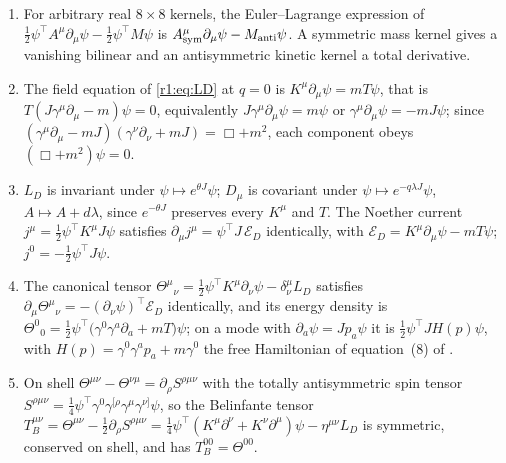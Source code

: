 \begin{proposition}
\label{r1:prop:dirac}
\begin{enumerate}[label=(\roman*),leftmargin=2.2em]
\item For arbitrary real $8\times8$ kernels, the Euler--Lagrange expression of $\tfrac12\psi^{\!\top}A^\mu\partial_\mu\psi-\tfrac12\psi^{\!\top}M\psi$
is $A^\mu_{\rm sym}\partial_\mu\psi-M_{\rm anti}\psi$. A symmetric mass kernel gives a vanishing bilinear and an antisymmetric kinetic
kernel a total derivative.
\item The field equation of \eqref{r1:eq:LD} at $q=0$ is $K^\mu\partial_\mu\psi=mT\psi$, that is $T(J\gamma^\mu\partial_\mu-m)\psi=0$,
equivalently $J\gamma^\mu\partial_\mu\psi=m\psi$ or $\gamma^\mu\partial_\mu\psi=-mJ\psi$; since
$(\gamma^\mu\partial_\mu-mJ)(\gamma^\nu\partial_\nu+mJ)=\Box+m^2$, each component obeys $(\Box+m^2)\psi=0$.
\item $L_D$ is invariant under $\psi\mapsto e^{\theta J}\psi$; $D_\mu$ is covariant under $\psi\mapsto e^{-q\lambda J}\psi$,
$A\mapsto A+d\lambda$, since $e^{-\theta J}$ preserves every $K^\mu$ and $T$. The Noether current $j^\mu=\tfrac12\psi^{\!\top}K^\mu J\psi$
satisfies $\partial_\mu j^\mu=\psi^{\!\top}J\,\mathcal E_D$ identically, with $\mathcal E_D=K^\mu\partial_\mu\psi-mT\psi$; $j^0=-\tfrac12\psi^{\!\top}J\psi$.
\item The canonical tensor $\Theta^\mu{}_\nu=\tfrac12\psi^{\!\top}K^\mu\partial_\nu\psi-\delta^\mu_\nu L_D$ satisfies
$\partial_\mu\Theta^\mu{}_\nu=-(\partial_\nu\psi)^{\!\top}\mathcal E_D$ identically, and its energy density is
$\Theta^0{}_0=\tfrac12\psi^{\!\top}\bigl(\gamma^0\gamma^a\partial_a+mT\bigr)\psi$; on a mode with $\partial_a\psi=Jp_a\psi$ it is
$\tfrac12\psi^{\!\top}JH(p)\psi$, with $H(p)=\gamma^0\gamma^ap_a+m\gamma^0$ the free Hamiltonian of equation~(8) of \cite{ES17}.
\item On shell $\Theta^{\mu\nu}-\Theta^{\nu\mu}=\partial_\rho S^{\rho\mu\nu}$ with the totally antisymmetric spin tensor
$S^{\rho\mu\nu}=\tfrac14\psi^{\!\top}\gamma^0\gamma^{[\rho}\gamma^\mu\gamma^{\nu]}\psi$, so the Belinfante tensor
$T_B^{\mu\nu}=\Theta^{\mu\nu}-\tfrac12\partial_\rho S^{\rho\mu\nu}=\tfrac14\psi^{\!\top}(K^\mu\partial^\nu+K^\nu\partial^\mu)\psi-\eta^{\mu\nu}L_D$ is
symmetric, conserved on shell, and has $T_B^{00}=\Theta^{00}$.
\end{enumerate}
\end{proposition}

